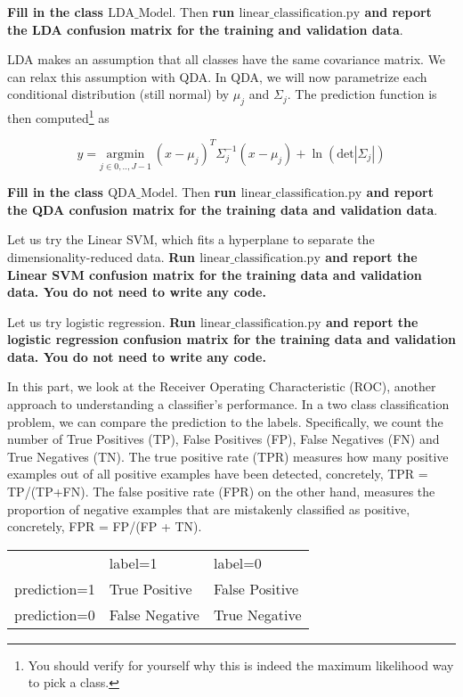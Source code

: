 \documentclass[preview]{standalone}
\begin{document}
\begin{Parts}
{\bf Fill in the class $\mbox{LDA\_Model}$}. Then {\bf run $\mbox{linear\_classification.py}$ and report the LDA confusion matrix for the training and validation data}.





 \Part LDA makes an assumption that all classes have the same
 covariance matrix. We can relax this assumption with QDA. In QDA, we
 will now parametrize each conditional distribution (still normal) by
 $\mu_j$ and $\Sigma_j$. The prediction function is then
 computed\footnote{You should verify for yourself why this is indeed
   the maximum likelihood way to pick a class.} as 

 $$y = \underset{j\in{0,..,J-1}}{\mbox{argmin}} \: (x-\mu_j)^T\Sigma_j^{-1}(x-\mu_j) + \ln(\mbox{det}|\Sigma_j|) $$


{\bf Fill in the class $\mbox{QDA\_Model}$}. Then {\bf run $\mbox{linear\_classification.py}$ and report the QDA confusion matrix for the training data and validation data}.

 

 \Part Let us try the Linear SVM, which fits a hyperplane
 to separate the dimensionality-reduced data. {\bf Run $\mbox{linear\_classification.py}$ and report the Linear SVM confusion matrix for the training data and validation data. You do not need to write any code. }




 \Part Let us try logistic regression. {\bf Run $\mbox{linear\_classification.py}$ and report the logistic regression confusion matrix for the training data and validation data. You do not need to write any code. }




\Part In this part, we look at the Receiver Operating Characteristic
(ROC), another approach to understanding a classifier's
performance. In a two class classification problem, we can compare the
prediction to the labels. Specifically, we count the number of True
Positives (TP), False Positives (FP), False Negatives (FN) and True
Negatives (TN). The true positive rate (TPR) measures how many
positive examples out of all positive examples have been detected,
concretely, TPR = TP/(TP+FN). The false positive rate (FPR) on the other
hand, measures the proportion of negative examples that are mistakenly
classified as positive, concretely, FPR = FP/(FP + TN).  


\begin{table}[]
\centering
\label{my-label}
\begin{tabular}{lll}
             & label=1        & label=0        \\
prediction=1 & True Positive  & False Positive \\
prediction=0 & False Negative & True Negative 
\end{tabular}
\end{table}


\end{Parts}
\end{document}
